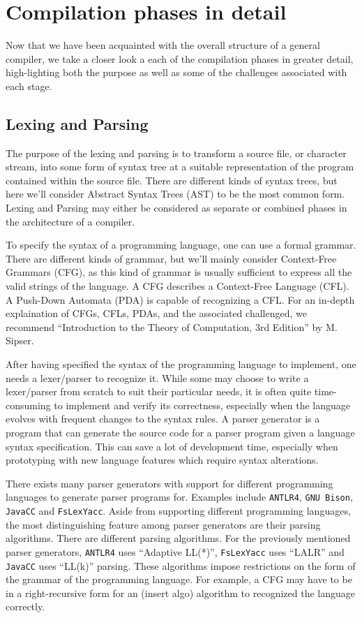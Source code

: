 \section{Compilation phases in detail}

Now that we have been acquainted with the overall structure of a general compiler, we take a closer look a each of the compilation phases in greater detail,
high-lighting both the purpose as well as some of the challenges associated with each stage.

\subsection{Lexing and Parsing}

The purpose of the lexing and parsing is to transform a source file, or character stream, into some form of syntax tree at a suitable representation of
the program contained within the source file. There are different kinds of syntax trees, but here we'll consider Abstract Syntax Trees (AST) to be the
most common form. Lexing and Parsing may either be considered as separate or combined phases in the architecture of a compiler.

To specify the syntax of a programming language, one can use a formal grammar. There are different kinds of grammar, but we'll mainly consider Context-Free
Grammars (CFG), as this kind of grammar is usually sufficient to express all the valid strings of the language. A CFG describes a Context-Free Language (CFL).
A Push-Down Automata (PDA) is capable of recognizing a CFL. For an in-depth explaination of CFGs, CFLs, PDAs, and the associated challenged, we
recommend ``Introduction to the Theory of Computation, 3rd Edition'' by M. Sipser.

After having specified the syntax of the programming language to implement, one needs a lexer/parser to recognize it. While some may choose to write a lexer/parser
from scratch to suit their particular needs, it is often quite time-consuming to implement and verify its correctness, especially when the language evolves with
frequent changes to the syntax rules. A parser generator is a program that can generate the source code for a parser program given a language syntax specification.
This can save a lot of development time, especially when prototyping with new language features which require syntax alterations.

There exists many parser generators with support for different programming languages to generate parser programs for. Examples include \texttt{ANTLR4}, \texttt{GNU Bison},
\texttt{JavaCC} and \texttt{FsLexYacc}. Aside from supporting different programming languages, the most distinguishing feature among parser generators are their parsing algorithms.
There are different parsing algorithms. For the previously mentioned parser generators, \texttt{ANTLR4} uses ``Adaptive LL(*)'', \texttt{FsLexYacc} uses ``LALR'' and \texttt{JavaCC}
uses ``LL(k)'' parsing. These algorithms impose restrictions on the form of the grammar of the programming language. For example, a CFG may have to be in a right-recursive
form for an (insert algo) algorithm to recognized the language correctly.


